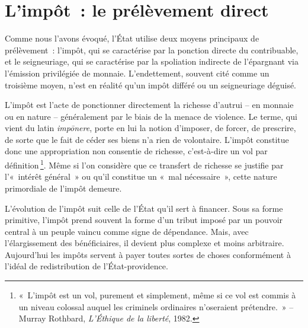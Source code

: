 \documentclass[a4paper,notitlepage]{article}
\newcommand{\sfootnote}{\,\footnote}
\begin{document}
\section{L'impôt~: le prélèvement direct}

Comme nous l'avons évoqué, l'État utilise deux moyens principaux de prélèvement~: l'impôt, qui se caractérise par la ponction directe du contribuable, et le seigneuriage, qui se caractérise par la spoliation indirecte de l'épargnant via l'émission privilégiée de monnaie. L'endettement, souvent cité comme un troisième moyen, n'est en réalité qu'un impôt différé ou un seigneuriage déguisé.

L'impôt est l'acte de ponctionner directement la richesse d'autrui -- en monnaie ou en nature -- généralement par le biais de la menace de violence. Le terme, qui vient du latin \emph{impōnere}, porte en lui la notion d'imposer, de forcer, de prescrire, de sorte que le fait de céder ses biens n'a rien de volontaire. L'impôt constitue donc une appropriation non consentie de richesse, c'est-à-dire un vol par définition\sfootnote{«~L'impôt est un vol, purement et simplement, même si ce vol est commis à un niveau colossal auquel les criminels ordinaires n'oseraient prétendre.~» -- Murray Rothbard, \emph{L'Éthique de la liberté}, 1982.}. Même si l'on considère que ce transfert de richesse se justifie par l'«~intérêt général~» ou qu'il constitue un «~mal nécessaire~», cette nature primordiale de l'impôt demeure.

L'évolution de l'impôt suit celle de l'État qu'il sert à financer. Sous sa forme primitive, l'impôt prend souvent la forme d'un tribut imposé par un pouvoir central à un peuple vaincu comme signe de dépendance. Mais, avec l'élargissement des bénéficiaires, il devient plus complexe et moins arbitraire. Aujourd'hui les impôts servent à payer toutes sortes de choses conformément à l'idéal de redistribution de l'État-providence. %
\end{document}
